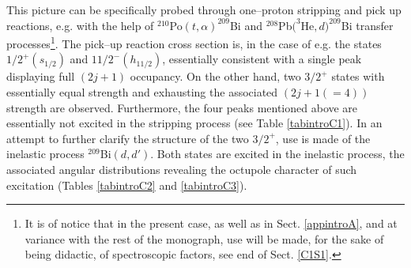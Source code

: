 This picture can be specifically probed through one--proton stripping and pick up reactions, e.g. with the help of $^{210}$Po$(t,\alpha)^{209}$Bi and $^{208}$Pb$(^3$He$,d)^{209}$Bi transfer processes\footnote{It is of notice that in the present case, as well as in Sect. \ref{appintroA}, and at variance with the rest of the monograph, use will be made, for the sake of being didactic, of spectroscopic factors, see end of Sect. \ref{C1S1}.}. The pick--up reaction cross section is, in the case of e.g. the states $1/2^+(s_{1/2})$ and $11/2^-(h_{11/2})$,  essentially consistent with a single peak displaying full $(2j+1)$ occupancy. On the other hand, two $3/2^+$ states with essentially equal strength and exhausting the associated $(2j+1(=4))$ strength are observed.   Furthermore,  the four peaks mentioned above are essentially not excited in the stripping process (see Table \ref{tabintroC1}). In an attempt to further clarify the structure of the two $3/2^+$, use is made of the inelastic process $^{209}$Bi$(d,d')$. Both states are excited in the inelastic process, the associated  angular distributions  revealing the octupole character of such excitation (Tables \ref{tabintroC2} and \ref{tabintroC3}).

